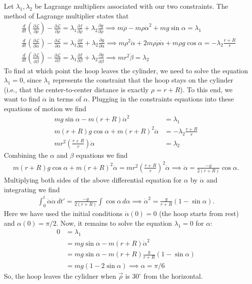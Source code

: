 \documentclass{article}
\theoremstyle{definition}
\newcommand{\p}{\partial}
\newcommand{\lag}{\mathcal{L}}
\newcommand{\al}{\alpha}
\newcommand{\be}{\beta}
\newcommand{\f}[2]{\frac{#1}{#2}}
\newcommand{\lp}{\left(}
\newcommand{\rp}{\right)}
\begin{document}
Let $\lambda_1, \lambda_2$ be Lagrange multipliers associated with our two constraints. The method of Lagrange multiplier states that
\begin{align*}
&\f{d}{dt}\lp \f{\p \lag}{\p \dot{\rho}} \rp - \f{\p \lag}{\p \rho} = \lambda_1 \f{\p f}{\p \rho} + \lambda_2 \f{\p g}{\p \dot{\rho}} 
\implies m\ddot{\rho} - m\rho \dot\alpha^2+mg\sin\al = \lambda_1\\
&\f{d}{dt}\lp \f{\p \lag}{\p \dot{\al}} \rp - \f{\p \lag}{\p \al} = \lambda_1 \f{\p f}{\p \al} + \lambda_2 \f{\p g}{\p \dot{\al}} 
\implies m\rho^2 \ddot\al+2m\rho \dot\rho\dot\al+m\rho g \cos\al = -\lambda_2 \f{r+R}{r} \\
&\f{d}{dt}\lp \f{\p \lag}{\p \dot{\be}} \rp - \f{\p \lag}{\p \be} = \lambda_1 \f{\p f}{\p \be} + \lambda_2 \f{\p g}{\p \dot{\be}} 
\implies  mr^2\ddot{\be} = \lambda_2
\end{align*}
To find at which point the hoop leaves the cylinder, we need to solve the equation $\lambda_1 = 0$, since $\lambda_1$ represents the constraint that the hoop stays on the cylinder (i.e., that the center-to-center distance is exactly $\rho = r+R$). To this end, we want to find $\dot{\al}$ in terms of $\al$. Plugging in the constraints equations into these equations of motion we find 
\begin{align*}
mg\sin\al - m(r+R)\dot\al^2 &= \lambda_1\\
m(r+R)g\cos\al + m(r+R)^2\ddot\al &= -\lambda_2 \f{r+R}{r}\\
mr^2 \lp \f{r+R}{r} \rp\ddot\al &= \lambda_2
\end{align*}
Combining the $\al$ and $\be$ equations we find 
\begin{align*}
m(r+R)g\cos\al + m(r+R)^2\ddot\al = mr^2\lp \f{r+R}{r} \rp^2\ddot{\al} \implies {\ddot{\al} = \f{-g}{2(r+R)}\cos\al}.
\end{align*}
Multiplying both sides of the above differential equation  for $\al$ by $\dot\al$ and integrating we find 
\begin{align*}
\int_0^t \ddot\al \dot\al \,dt' = \f{-g}{2(r+R)} \int \cos\al \,d\al \implies \dot\al^2 = \f{g}{r+R}\lp 1 - \sin\al \rp.
\end{align*}
Here we have used the initial conditions $\dot\al(0) =0$ (the hoop starts from rest) and $\al(0) = \pi/2$. Now, it remains to solve the equation $\lambda_1 = 0$ for $\al$:
\begin{align*}
0 &= \lambda_1 \\
&= mg\sin\al - m(r+R)\dot\al^2\\
&= mg\sin\al - m(r+R)\f{g}{r+R}(1-\sin\al)\\
&= mg(1-2\sin\al) \implies \boxed{\al = \pi/6}
\end{align*}
So, the hoop leaves the cylidner when $\vec{\rho}$ is $30^\circ$ from the horizontal. \\
\end{document}

